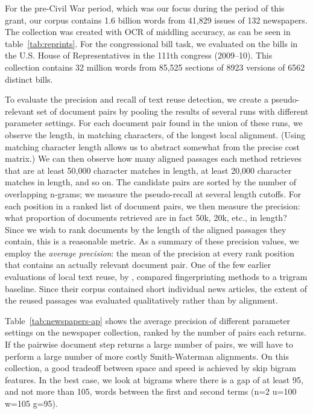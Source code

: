 \documentclass[pdftex,11pt]{article}
\begin{document}
For the pre-Civil War period, which was our focus during the period of this grant, our corpus contains 1.6 billion words from
41,829 issues of 132 newspapers.  The collection was created with OCR
of middling accuracy, as can be seen in table~\ref{tab:reprints}.  For
the congressional bill task, we evaluated on the bills in the
U.S. House of Representatives in the 111th congress (2009--10).  This
collection contains 32 million words from 85,525 sections of 8923
versions of 6562 distinct bills.

To evaluate the precision and recall of text reuse detection, we
create a pseudo-relevant set of document pairs by pooling the results
of several runs with different parameter settings.  For each document
pair found in the union of these runs, we observe the length, in
matching characters, of the longest local alignment.  (Using matching
character length allows us to abstract somewhat from the precise cost
matrix.)  We can then observe how many aligned passages each method
retrieves that are at least 50,000 character matches in length, at
least 20,000 character matches in length, and so on.  The candidate
pairs are sorted by the number of overlapping n-grams; we measure the
pseudo-recall at several length cutoffs.  For each position in a
ranked list of document pairs, we then measure the precision: what
proportion of documents retrieved are in fact 50k, 20k, etc., in
length?  Since we wish to rank documents by the length of the aligned
passages they contain, this is a reasonable metric.  As a summary of
these precision values, we employ the \emph{average precision}: the
mean of the precision at every rank position that contains an actually
relevant document pair.  One of the few earlier evaluations of local
text reuse, by \citet{seo08:_local_text_reuse_detec}, compared
fingerprinting methods to a trigram baseline.  Since their corpus
contained short individual news articles, the extent of the reused
passages was evaluated qualitatively rather than by alignment.

Table~\ref{tab:newspapers-ap} shows the average precision of different
parameter settings on the newspaper collection, ranked by the number
of pairs each returns.  If the pairwise document step returns a large
number of pairs, we will have to perform a large number of more costly
Smith-Waterman alignments.  On this collection, a good tradeoff
between space and speed is achieved by skip bigram features.  In the
best case, we look at bigrams where there is a gap of at least 95, and
not more than 105, words between the first and second terms (n=2
u=100 w=105 g=95).
\end{document}
